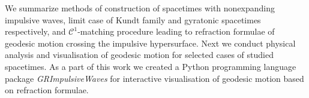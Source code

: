 \documentclass[12pt]{report}
\begin{document}

We summarize methods of construction of spacetimes with nonexpanding impulsive waves,
limit case of Kundt family and gyratonic spacetimes respectively, and $\mathcal{C}^1$-matching procedure
leading to refraction formulae of geodesic motion crossing the impulsive hypersurface.
Next we conduct physical analysis and visualisation of geodesic motion for selected cases of studied spacetimes.
As a part of this work we created a Python programming language package \emph{GRImpulsiveWaves} for
interactive visualisation of geodesic motion based on refraction formulae.
\end{document}

